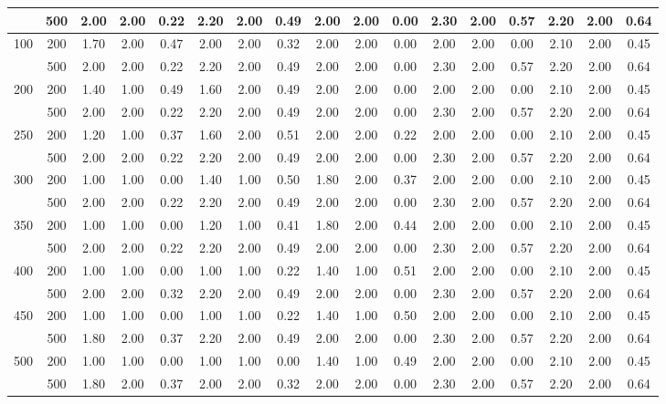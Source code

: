 \documentclass[11pt,onside,a4paper,fleqn]{report}
\begin{document}
\begin{table}[!h]
\begin{center}
{\begin{tabular}{|c | c | c c c | c c c | c c c|c c c|c c c|}
          & 500       &  2.00	&2.00	&0.22	&2.20	&2.00	&0.49	&2.00	&2.00	&0.00	&2.30	&2.00	&0.57	&2.20	&2.00	&0.64\\ \hline
    100   & 200       &  1.70	&2.00	&0.47	&2.00	&2.00	&0.32	&2.00	&2.00	&0.00	&2.00	&2.00	&0.00	&2.10	&2.00	&0.45\\
          & 500       &  2.00	&2.00	&0.22	&2.20	&2.00	&0.49	&2.00	&2.00	&0.00	&2.30	&2.00	&0.57	&2.20	&2.00	&0.64\\ \hline
    200   & 200       &  1.40	&1.00	&0.49	&1.60	&2.00	&0.49	&2.00	&2.00	&0.00	&2.00	&2.00	&0.00	&2.10	&2.00	&0.45\\
          & 500       &  2.00	&2.00	&0.22	&2.20	&2.00	&0.49	&2.00	&2.00	&0.00	&2.30	&2.00	&0.57	&2.20	&2.00	&0.64\\ \hline
    250   & 200       &  1.20	&1.00	&0.37	&1.60	&2.00	&0.51	&2.00	&2.00	&0.22	&2.00	&2.00	&0.00	&2.10	&2.00	&0.45\\
          & 500       &  2.00	&2.00	&0.22	&2.20	&2.00	&0.49	&2.00	&2.00	&0.00	&2.30	&2.00	&0.57	&2.20	&2.00	&0.64\\ \hline
    300   & 200       &  1.00	&1.00	&0.00	&1.40	&1.00	&0.50	&1.80	&2.00	&0.37	&2.00	&2.00	&0.00	&2.10	&2.00	&0.45\\
          & 500       &  2.00	&2.00	&0.22	&2.20	&2.00	&0.49	&2.00	&2.00	&0.00	&2.30	&2.00	&0.57	&2.20	&2.00	&0.64\\ \hline
    350   & 200       &  1.00	&1.00	&0.00	&1.20	&1.00	&0.41	&1.80	&2.00	&0.44	&2.00	&2.00	&0.00	&2.10	&2.00	&0.45\\
          & 500       &  2.00	&2.00	&0.22	&2.20	&2.00	&0.49	&2.00	&2.00	&0.00	&2.30	&2.00	&0.57	&2.20	&2.00	&0.64\\ \hline
    400   & 200       &  1.00	&1.00	&0.00	&1.00	&1.00	&0.22	&1.40	&1.00	&0.51	&2.00	&2.00	&0.00	&2.10	&2.00	&0.45\\
          & 500       &  2.00	&2.00	&0.32	&2.20	&2.00	&0.49	&2.00	&2.00	&0.00	&2.30	&2.00	&0.57	&2.20	&2.00	&0.64\\ \hline
    450   & 200       &  1.00	&1.00	&0.00	&1.00	&1.00	&0.22	&1.40	&1.00	&0.50	&2.00	&2.00	&0.00	&2.10	&2.00	&0.45\\
          & 500       &  1.80	&2.00	&0.37	&2.20	&2.00	&0.49	&2.00	&2.00	&0.00	&2.30	&2.00	&0.57	&2.20	&2.00	&0.64\\ \hline
    500   & 200       &  1.00	&1.00	&0.00	&1.00	&1.00	&0.00	&1.40	&1.00	&0.49	&2.00	&2.00	&0.00	&2.10	&2.00	&0.45\\
          & 500       &  1.80	&2.00	&0.37	&2.00	&2.00	&0.32	&2.00	&2.00	&0.00	&2.30	&2.00	&0.57	&2.20	&2.00	&0.64\\ \hline
    \end{tabular}}
    \end{center}
    \end{table}
\end{document}
